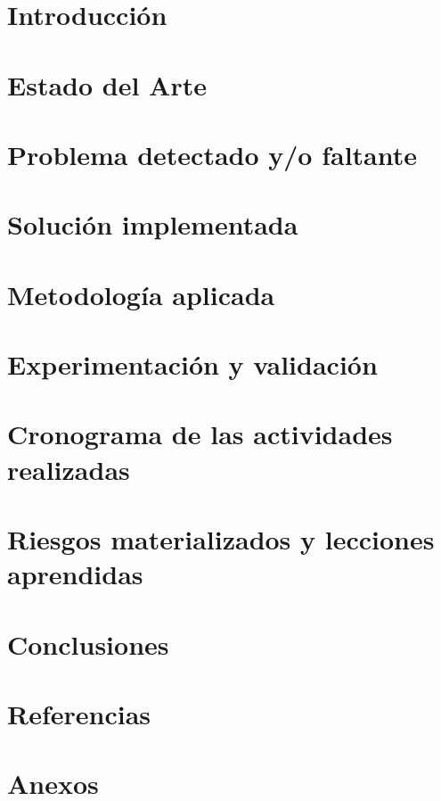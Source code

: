 \documentclass[11pt]{article}
\begin{document}


\newpage

\section{Introducción}



\section{Estado del Arte}



\section{Problema detectado y/o faltante}



\section{Solución implementada}



\section{Metodología aplicada}



\section{Experimentación y validación}



\section{Cronograma de las actividades realizadas}



\section{Riesgos materializados y lecciones aprendidas}



\section{Conclusiones}



\section{Referencias}



\section{Anexos}


\end{document}
